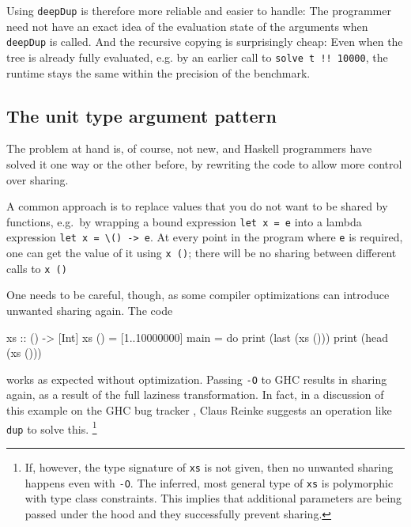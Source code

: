 \documentclass[preprint]{sigplanconf}
\theoremstyle{nonumberplain}
\newcommand{\li}{\lstinline[style=Haskell]}
\newcommand{\ci}{\lstinline[style=Cmm]}
\begin{document}
Using \li-deepDup- is therefore more reliable and easier to handle: The programmer need not have an exact idea of the evaluation state of the arguments when \li-deepDup- is called. And the recursive copying is surprisingly cheap: Even when the tree is already fully evaluated, e.g. by an earlier call to \li-solve t !! 10000-, the runtime stays the same within the precision of the benchmark.


\subsection{The unit type argument pattern}

The problem at hand is, of course, not new, and Haskell programmers have solved it one way or the other before, by rewriting the code to allow more control over sharing.

\label{sec:unit}

A common approach is to replace values that you do not want to be shared by functions, e.g.\ by wrapping a bound expression \li-let x = e- into a lambda expression \li!let x = \() -> e!. At every point in the program where \li-e- is required, one can get the value of it using \li-x ()-; there will be no sharing between different calls to \li-x ()-

One needs to be careful, though, as some compiler optimizations can introduce unwanted sharing again. The code
\begin{haskell}
xs :: () -> [Int]
xs () = [1..10000000]
main = do
    print (last (xs ()))
    print (head (xs ()))
\end{haskell}
works as expected without optimization. Passing  \ci!-O! to GHC results in sharing again, as a result of the full laziness transformation. In fact, in a discussion of this example on the GHC bug tracker \citep{spaceleakbug}, Claus Reinke suggests an operation like \li-dup- to solve this.%
\footnote{
If, however, the type signature of \li-xs- is not given, then no unwanted sharing happens even with \ci!-O!. The inferred, most general type of \li-xs- is polymorphic with type class constraints. This implies that additional parameters are being passed under the hood and they successfully prevent sharing.
}
\end{document}
